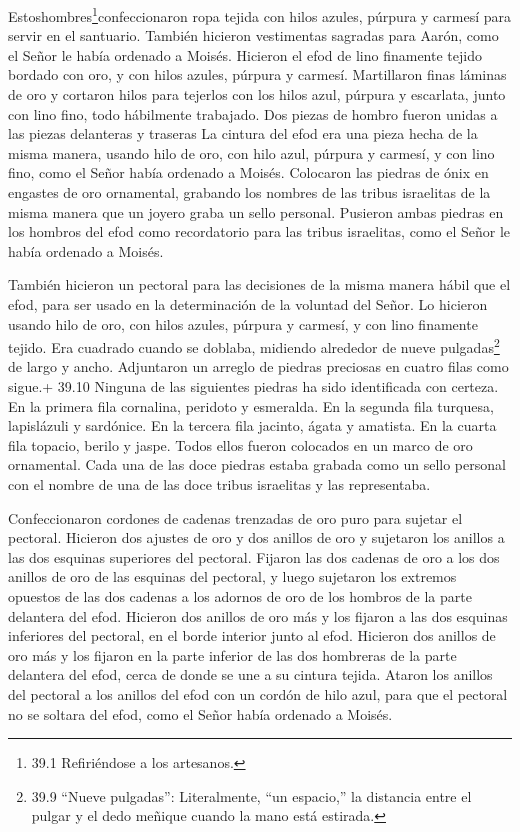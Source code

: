  Estoshombres\footnote{39.1 Refiriéndose a los artesanos.}confeccionaron
ropa tejida con hilos azules, púrpura y carmesí para servir en el
santuario. También hicieron vestimentas sagradas para Aarón, como el
Señor le había ordenado a Moisés.  Hicieron el efod de lino
finamente tejido bordado con oro, y con hilos azules, púrpura y carmesí.
 Martillaron finas láminas de oro y cortaron hilos para
tejerlos con los hilos azul, púrpura y escarlata, junto con lino fino,
todo hábilmente trabajado.  Dos piezas de hombro fueron
unidas a las piezas delanteras y traseras  La cintura del
efod era una pieza hecha de la misma manera, usando hilo de oro, con
hilo azul, púrpura y carmesí, y con lino fino, como el Señor había
ordenado a Moisés.  Colocaron las piedras de ónix en
engastes de oro ornamental, grabando los nombres de las tribus
israelitas de la misma manera que un joyero graba un sello personal.
 Pusieron ambas piedras en los hombros del efod como
recordatorio para las tribus israelitas, como el Señor le había ordenado
a Moisés.

 También hicieron un pectoral para las decisiones de la
misma manera hábil que el efod, para ser usado en la determinación de la
voluntad del Señor. Lo hicieron usando hilo de oro, con hilos azules,
púrpura y carmesí, y con lino finamente tejido.  Era
cuadrado cuando se doblaba, midiendo alrededor de nueve
pulgadas\footnote{39.9 ``Nueve pulgadas'': Literalmente, ``un espacio,''
  la distancia entre el pulgar y el dedo meñique cuando la mano está
  estirada.} de largo y ancho.  Adjuntaron un arreglo de
piedras preciosas en cuatro filas como sigue.+ 39.10 Ninguna de las
siguientes piedras ha sido identificada con certeza. En la primera fila
cornalina, peridoto y esmeralda.  En la segunda fila
turquesa, lapislázuli y sardónice.  En la tercera fila
jacinto, ágata y amatista.  En la cuarta fila topacio,
berilo y jaspe. Todos ellos fueron colocados en un marco de oro
ornamental.  Cada una de las doce piedras estaba grabada
como un sello personal con el nombre de una de las doce tribus
israelitas y las representaba.

 Confeccionaron cordones de cadenas trenzadas de oro puro
para sujetar el pectoral.  Hicieron dos ajustes de oro y
dos anillos de oro y sujetaron los anillos a las dos esquinas superiores
del pectoral.  Fijaron las dos cadenas de oro a los dos
anillos de oro de las esquinas del pectoral,  y luego
sujetaron los extremos opuestos de las dos cadenas a los adornos de oro
de los hombros de la parte delantera del efod.  Hicieron
dos anillos de oro más y los fijaron a las dos esquinas inferiores del
pectoral, en el borde interior junto al efod.  Hicieron dos
anillos de oro más y los fijaron en la parte inferior de las dos
hombreras de la parte delantera del efod, cerca de donde se une a su
cintura tejida.  Ataron los anillos del pectoral a los
anillos del efod con un cordón de hilo azul, para que el pectoral no se
soltara del efod, como el Señor había ordenado a Moisés.


